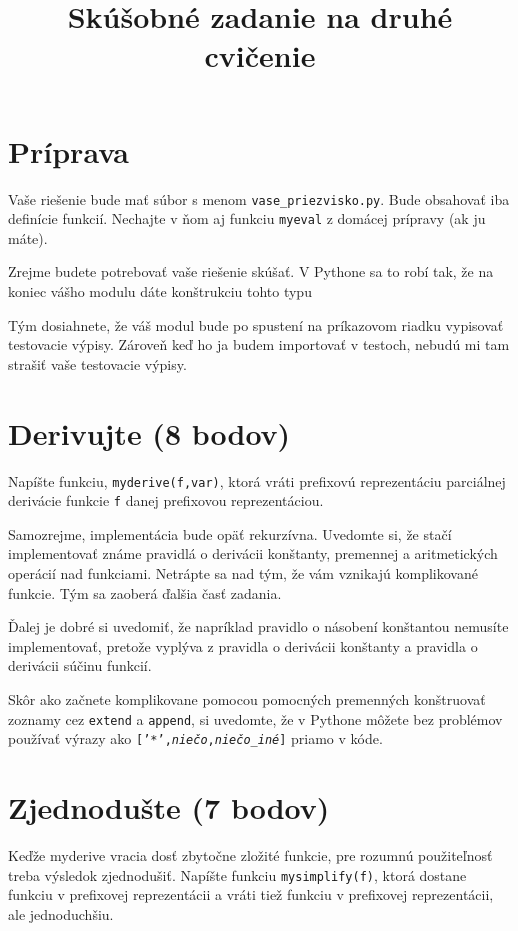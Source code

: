 \documentclass{article}
\begin{document}
\title{Skúšobné zadanie na druhé cvičenie}
\maketitle
\section{Príprava}
Vaše riešenie bude mať súbor s menom {\tt vase\_priezvisko.py}. Bude obsahovať
iba definície funkcií. Nechajte v ňom aj funkciu {\tt myeval} z domácej prípravy
(ak ju máte).

Zrejme budete potrebovať vaše riešenie skúšať. V Pythone sa to robí tak, že na koniec vášho
modulu dáte konštrukciu tohto typu
\begin{framed}

\end{framed}

Tým dosiahnete, že váš modul bude po spustení na príkazovom riadku vypisovať testovacie výpisy.
Zároveň keď ho ja budem importovať v testoch, nebudú mi tam strašiť vaše testovacie výpisy.


\section{Derivujte (8 bodov)}

Napíšte funkciu, {\tt myderive(f,var)}, ktorá vráti prefixovú reprezentáciu parciálnej
derivácie funkcie {\tt f} danej prefixovou reprezentáciou. 
\begin{framed}

\end{framed}
Samozrejme, implementácia bude opäť rekurzívna. Uvedomte si, že stačí implementovať známe
pravidlá o derivácii konštanty, premennej a aritmetických operácií nad funkciami. Netrápte
sa nad tým, že vám vznikajú komplikované funkcie. Tým sa zaoberá ďalšia časť zadania.

Ďalej je dobré si uvedomiť, že napríklad pravidlo o násobení konštantou nemusíte implementovať,
pretože vyplýva z pravidla o derivácii konštanty a pravidla o derivácii súčinu funkcií.

Skôr ako začnete komplikovane pomocou pomocných premenných 
konštruovať zoznamy cez
{\tt extend} a {\tt append},
si uvedomte, že v Pythone môžete bez problémov
používať výrazy ako {\tt ['*',{\em niečo},{\em niečo\_iné}]} priamo v kóde.


\section{Zjednodušte (7 bodov)}
Keďže myderive vracia dosť zbytočne zložité funkcie, pre rozumnú použiteľnosť treba
výsledok zjednodušiť. Napíšte funkciu {\tt mysimplify(f)}, ktorá dostane funkciu v prefixovej
reprezentácii a vráti tiež funkciu v prefixovej reprezentácii, ale jednoduchšiu.
\end{document}

